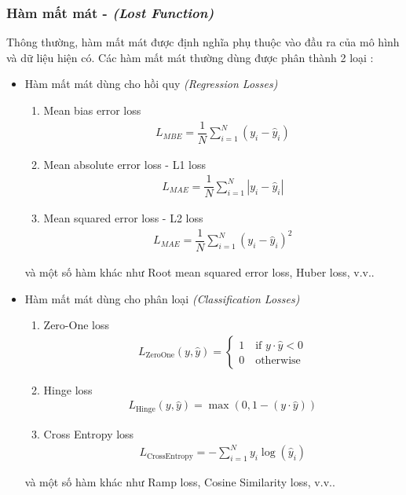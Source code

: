 \subsubsection{Hàm mất mát - \textit{(Lost Function)}}
Thông thường, hàm mất mát được định nghĩa phụ thuộc vào đầu ra của mô hình và dữ liệu hiện có. Các hàm mất mát thường dùng được phân thành 2 loại \cite{ciampiconi2023surveytaxonomylossfunctions}:
\begin{itemize}
    \item Hàm mất mát dùng cho hồi quy \textit{(Regression Losses)}
          \begin{enumerate}
              \item Mean bias error loss
                    \begin{align}
                        L_{MBE}=\dfrac{1}{N}\sum_{i=1}^N\left(y_i-\hat y_i\right)
                    \end{align}
              \item Mean absolute error loss - L1 loss
                    \begin{align}
                        L_{MAE}=\dfrac{1}{N}\sum_{i=1}^N\left|y_i-\hat y_i\right|
                    \end{align}
              \item Mean squared error loss - L2 loss
                    \begin{align}
                        L_{MAE}=\dfrac{1}{N}\sum_{i=1}^N\left(y_i-\hat y_i\right)^2
                    \end{align}
          \end{enumerate}
          và một số hàm khác như Root mean squared error loss, Huber loss, v.v..
    \item Hàm mất mát dùng cho phân loại \textit{(Classification Losses)}
          \begin{enumerate}
              \item Zero-One loss
                    \begin{align}
                        L_\text{ZeroOne}(y,\hat y)=
                        \begin{cases}
                            1\quad\text{if }y\cdot\hat y<0 \\
                            0\quad\text{otherwise}
                        \end{cases}
                    \end{align}
              \item Hinge loss
                    \begin{align}
                        L_\text{Hinge}(y,\hat y)=\max(0,1-(y\cdot\hat y))
                    \end{align}
              \item Cross Entropy loss
                    \begin{align}
                        L_\text{CrossEntropy}=-\sum_{i=1}^N y_i\log(\hat y_i)
                    \end{align}
          \end{enumerate}
          và một số hàm khác như Ramp loss, Cosine Similarity loss, v.v..
\end{itemize}

